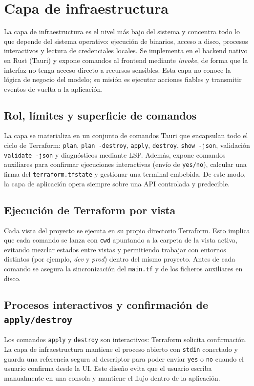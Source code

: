 \documentclass{article}
\begin{document}
    \newpage
    \section{Capa de infraestructura} {
        \setlength{\parskip}{1em}

        \justify
        La capa de infraestructura es el nivel más bajo del sistema y concentra todo
        lo que depende del sistema operativo: ejecución de binarios, acceso a disco,
        procesos interactivos y lectura de credenciales locales. Se implementa en el
        backend nativo en Rust (Tauri) y expone comandos al frontend mediante
        \textit{invoke}, de forma que la interfaz no tenga acceso directo a recursos
        sensibles. Esta capa no conoce la lógica de negocio del modelo; su misión es
        ejecutar acciones fiables y transmitir eventos de vuelta a la aplicación.

        \subsection{Rol, límites y superficie de comandos}
        \justify
        La capa se materializa en un conjunto de comandos Tauri que encapsulan todo
        el ciclo de Terraform: \texttt{plan}, \texttt{plan -destroy}, \texttt{apply},
        \texttt{destroy}, \texttt{show -json}, validación \texttt{validate -json} y
        diagnósticos mediante LSP. Además, expone comandos auxiliares para confirmar
        ejecuciones interactivas (envío de \texttt{yes/no}), calcular una firma del
        \texttt{terraform.tfstate} y gestionar una terminal embebida. De este modo,
        la capa de aplicación opera siempre sobre una API controlada y predecible.

        \subsection{Ejecución de Terraform por vista}
        \justify
        Cada vista del proyecto se ejecuta en su propio directorio Terraform. Esto
        implica que cada comando se lanza con \texttt{cwd} apuntando a la carpeta de
        la vista activa, evitando mezclar estados entre vistas y permitiendo trabajar
        con entornos distintos (por ejemplo, \textit{dev} y \textit{prod}) dentro del
        mismo proyecto. Antes de cada comando se asegura la sincronización del
        \texttt{main.tf} y de los ficheros auxiliares en disco.

        \subsection{Procesos interactivos y confirmación de \texttt{apply/destroy}}
        \justify
        Los comandos \texttt{apply} y \texttt{destroy} son interactivos: Terraform
        solicita confirmación. La capa de infraestructura mantiene el proceso abierto
        con \texttt{stdin} conectado y guarda una referencia segura al descriptor para
        poder enviar \texttt{yes} o \texttt{no} cuando el usuario confirma desde la UI.
        Este diseño evita que el usuario escriba manualmente en una consola y mantiene
        el flujo dentro de la aplicación.

}
\end{document}
